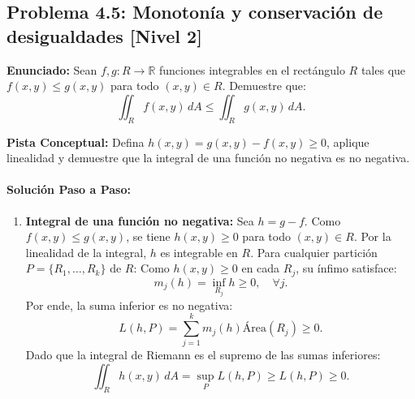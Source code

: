 \documentclass[11pt,a4paper]{article}
\begin{document}
\subsection*{Problema 4.5: Monotonía y conservación de desigualdades \hfill \color{primaryblue}\small[Nivel 2]}

\begin{tcolorbox}[colback=white,colframe=gray!40,arc=1mm,boxrule=0.5pt,left=3mm,right=3mm,top=2mm,bottom=2mm]
\textbf{Enunciado:} Sean $f, g: R \to \mathbb{R}$ funciones integrables en el rectángulo $R$ tales que $f(x,y) \le g(x,y)$ para todo $(x,y) \in R$. Demuestre que:
\begin{equation*}
\iint_R f(x,y) \, dA \le \iint_R g(x,y) \, dA.
\end{equation*}
\end{tcolorbox}

\begin{tcolorbox}[colback=yellow!4,colframe=accentamber!70,arc=1mm,boxrule=0.5pt,left=3mm,right=3mm,top=1.5mm,bottom=1.5mm]
\textbf{Pista Conceptual:} Defina $h(x,y) = g(x,y) - f(x,y) \ge 0$, aplique linealidad y demuestre que la integral de una función no negativa es no negativa.
\end{tcolorbox}

\paragraph{Solución Paso a Paso:}\par
\begin{enumerate}[label=\textbf{\arabic*.}]
\item \textbf{Integral de una función no negativa:}
Sea $h = g - f$. Como $f(x,y) \le g(x,y)$, se tiene $h(x,y) \ge 0$ para todo $(x,y) \in R$.
Por la linealidad de la integral, $h$ es integrable en $R$.
Para cualquier partición $P = \{R_1, \dots, R_k\}$ de $R$:
Como $h(x,y) \ge 0$ en cada $R_j$, su ínfimo satisface:
\begin{equation*}
m_j(h) = \inf_{R_j} h \ge 0, \quad \forall j.
\end{equation*}
Por ende, la suma inferior es no negativa:
\begin{equation*}
L(h, P) = \sum_{j=1}^k m_j(h) \text{Área}(R_j) \ge 0.
\end{equation*}
Dado que la integral de Riemann es el supremo de las sumas inferiores:
\begin{equation*}
\iint_R h(x,y) \, dA = \sup_P L(h, P) \ge L(h, P) \ge 0.
\end{equation*}
\end{enumerate}
\end{document}

